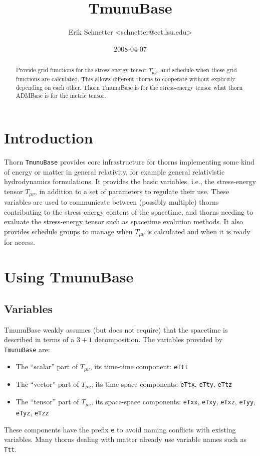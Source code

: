 \documentclass{article}
\begin{document}
\author{Erik Schnetter \textless schnetter@cct.lsu.edu\textgreater}

\title{TmunuBase}

\date{2008-04-07}

\maketitle


\begin{abstract}
  Provide grid functions for the stress-energy tensor $T_{\mu\nu}$,
  and schedule when these grid functions are calculated.  This allows
  different thorns to cooperate without explicitly depending on each
  other.  Thorn TmunuBase is for the stress-energy
  tensor what thorn ADMBase is for the metric tensor.
\end{abstract}

\section{Introduction}

Thorn \texttt{TmunuBase} provides core infrastructure for thorns
implementing some kind of energy or matter in general relativity, for
example general relativistic hydrodynamics formulations.  It provides
the basic variables, i.e., the stress-energy tensor $T_{\mu\nu}$, in
addition to a set of parameters to regulate their use.  These
variables are used to communicate between (possibly multiple) thorns
contributing to the stress-energy content of the spacetime, and thorns
needing to evaluate the stress-energy tensor such as spacetime
evolution methods.  It also provides schedule groups to manage when
$T_{\mu\nu}$ is calculated and when it is ready for access.

\section{Using TmunuBase}

\subsection{Variables}

TmunuBase weakly assumes (but does not require) that the spacetime is
described in terms of a $3+1$ decomposition.  The variables provided
by \texttt{TmunuBase} are:
\begin{itemize}
\item The ``scalar'' part of $T_{\mu\nu}$, its time-time component:
  \texttt{eTtt}
\item The ``vector'' part of $T_{\mu\nu}$, its time-space components:
  \texttt{eTtx}, \texttt{eTty}, \texttt{eTtz}
\item The ``tensor'' part of $T_{\mu\nu}$, its space-space components:
  \texttt{eTxx}, \texttt{eTxy}, \texttt{eTxz}, \texttt{eTyy},
  \texttt{eTyz}, \texttt{eTzz}
\end{itemize}
These components have the prefix \texttt{e} to avoid naming conflicts
with existing variables.  Many thorns dealing with matter already use
variable names such as \texttt{Ttt}.
\end{document}
